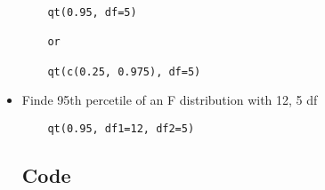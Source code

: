 \begin{itemize}
\begin{verbatim}
    qt(0.95, df=5)

    or

    qt(c(0.25, 0.975), df=5)
\end{verbatim}

\item Finde 95th percetile of an F distribution with 12, 5 df

\begin{verbatim}
    qt(0.95, df1=12, df2=5)
\end{verbatim}




\subsection{Code}
    
\end{itemize}
